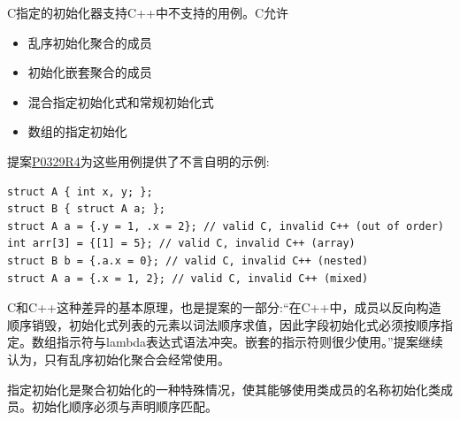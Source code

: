 \begin{tcolorbox}[breakable,enhanced jigsaw,colback=red!5!white,colframe=red!75!black,title={C和C++的区别}]
C指定的初始化器支持C++中不支持的用例。C允许

\begin{itemize}
\item 
乱序初始化聚合的成员

\item 
初始化嵌套聚合的成员

\item 
混合指定初始化式和常规初始化式

\item 
数组的指定初始化
\end{itemize}

提案\href{http://www.open-std.org/jtc1/sc22/wg21/docs/papers/2017/p0329r4.pdf}{P0329R4}为这些用例提供了不言自明的示例:

\begin{lstlisting}[style=styleCXX]
struct A { int x, y; };
struct B { struct A a; };
struct A a = {.y = 1, .x = 2}; // valid C, invalid C++ (out of order)
int arr[3] = {[1] = 5}; // valid C, invalid C++ (array)
struct B b = {.a.x = 0}; // valid C, invalid C++ (nested)
struct A a = {.x = 1, 2}; // valid C, invalid C++ (mixed)
\end{lstlisting}

C和C++这种差异的基本原理，也是提案的一部分:“在C++中，成员以反向构造顺序销毁，初始化式列表的元素以词法顺序求值，因此字段初始化式必须按顺序指定。数组指示符与lambda表达式语法冲突。嵌套的指示符则很少使用。”提案继续认为，只有乱序初始化聚合会经常使用。

\end{tcolorbox}	

\begin{tcolorbox}[breakable,enhanced jigsaw,colback=mygreen!5!white,colframe=mygreen!75!black,title={总结}]
指定初始化是聚合初始化的一种特殊情况，使其能够使用类成员的名称初始化类成员。初始化顺序必须与声明顺序匹配。
\end{tcolorbox}	

\newpage






